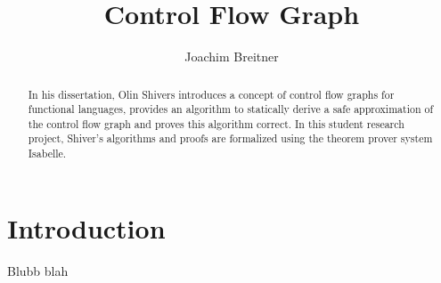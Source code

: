 \documentclass[11pt,a4paper]{article}
\begin{document}
\title{Control Flow Graph}
\author{Joachim Breitner}
\maketitle

\begin{abstract}
  In his dissertation\cite{Shivers}, Olin Shivers introduces a concept of control flow graphs
  for functional languages, provides an algorithm to statically derive a safe
  approximation of the control flow graph and proves this algorithm correct. In
  this student research project, Shiver’s algorithms and proofs are formalized
  using the theorem prover system Isabelle.
\end{abstract}

\tableofcontents

%

\section{Introduction}

Blubb blah







\end{document}
